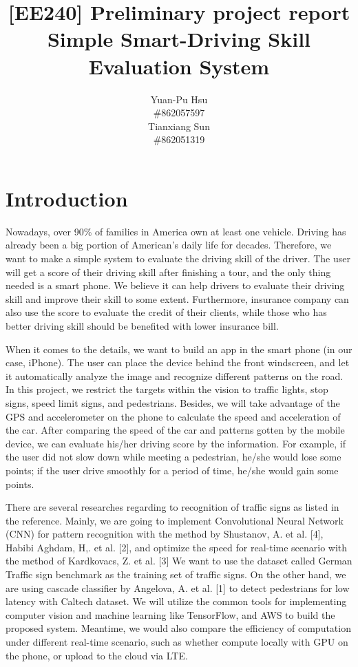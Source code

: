 \documentclass{article}
\title{[EE240] Preliminary project report\\Simple Smart-Driving Skill Evaluation System}
\author{
  Yuan-Pu Hsu \\\#862057597\\
  \And 
  Tianxiang Sun\\\#862051319\\
}
\begin{document}

\maketitle



\section{Introduction}

Nowadays, over 90\% of families in America own at least one vehicle. Driving has already been a big portion of American’s daily life for decades. Therefore, we want to make a simple system to evaluate the driving skill of the driver. The user will get a score of their driving skill after finishing a tour, and the only thing needed is a smart phone. We believe it can help drivers to evaluate their driving skill and improve their skill to some extent. Furthermore, insurance company can also use the score to evaluate the credit of their clients, while those who has better driving skill should be benefited with lower insurance bill.

When it comes to the details, we want to build an app in the smart phone (in our case, iPhone). The user can place the device behind the front windscreen, and let it automatically analyze the image and recognize different patterns on the road. In this project, we restrict the targets within the vision to traffic lights, stop signs, speed limit signs, and pedestrians. Besides, we will take advantage of the GPS and accelerometer on the phone to calculate the speed and acceleration of the car. After comparing the speed of the car and patterns gotten by the mobile device, we can evaluate his/her driving score by the information. For example, if the user did not slow down while meeting a pedestrian, he/she would lose some points; if the user drive smoothly for a period of time, he/she would gain some points.

There are several researches regarding to recognition of traffic signs as listed in the reference. Mainly, we are going to implement Convolutional Neural Network (CNN) for pattern recognition with the method by Shustanov, A. et al. [4], Habibi Aghdam, H,. et al. [2], and optimize the speed for real-time scenario with the method of Kardkovacs, Z. et al. [3] We want to use the dataset called German Traffic sign benchmark as the training set of traffic signs. On the other hand, we are using cascade classifier by Angelova, A. et al. [1] to detect pedestrians for low latency with Caltech dataset. We will utilize the common tools for implementing computer vision and machine learning like TensorFlow, and AWS to build the proposed system. Meantime, we would also compare the efficiency of computation under different real-time scenario, such as whether compute locally with GPU on the phone, or upload to the cloud via LTE.
\end{document}
